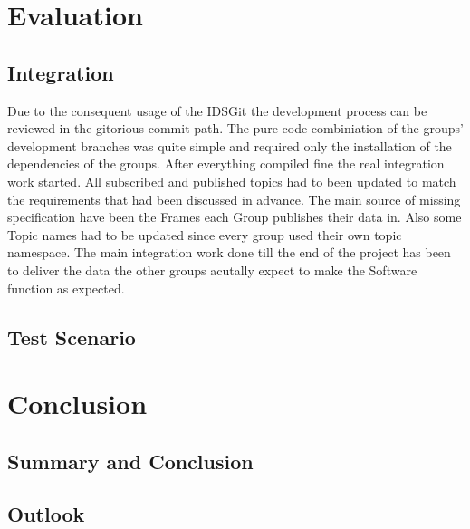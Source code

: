 \chapter{Evaluation}
\section{Integration}
Due to the consequent usage of the IDSGit the development process can be reviewed in the gitorious commit path. The pure code combiniation of the groups' development branches was quite simple and required only the installation of the dependencies of the groups. After everything compiled fine the real integration work started. All subscribed and published topics had to been updated to match the requirements that had been discussed in advance. The main source of missing specification have been the Frames each Group publishes their data in. Also some Topic names had to be updated since every group used their own topic namespace.
The main integration work done till the end of the project has been to deliver the data the other groups acutally expect to make the Software function as expected.
\section{Test Scenario}
\chapter{Conclusion}
\section{Summary and Conclusion}
\section{Outlook}